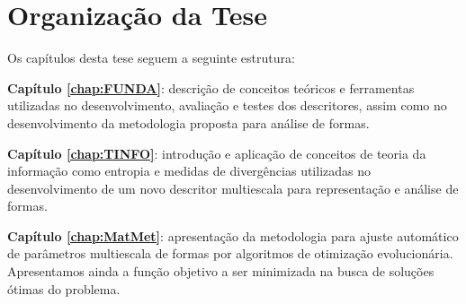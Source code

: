 \section{Organização da Tese \label{sec:org}}

Os capítulos desta tese seguem a seguinte estrutura:

\noindent \textbf{Capítulo \ref{chap:FUNDA}}:  descrição de conceitos teóricos e ferramentas utilizadas no desenvolvimento, avaliação e testes dos descritores, assim como no desenvolvimento da metodologia proposta para análise de formas.

\noindent \textbf{Capítulo \ref{chap:TINFO}}:  introdução e aplicação de conceitos de teoria da informação como entropia e medidas de divergências utilizadas no desenvolvimento de um novo descritor multiescala para representação e análise de formas.

\noindent \textbf{Capítulo \ref{chap:MatMet}}:  apresentação da metodologia para ajuste automático de parâmetros multiescala de formas por algoritmos de otimização evolucionária. Apresentamos ainda a função objetivo a ser minimizada na busca de soluções ótimas do problema.


